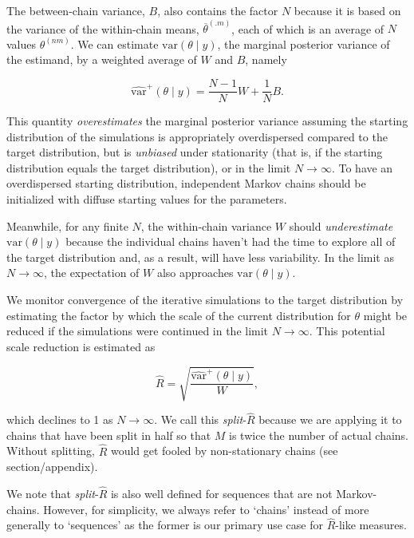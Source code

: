 \documentclass[american,]{article}
\begin{document}
The between-chain variance, \(B\), also contains the factor \(N\)
because it is based on the variance of the within-chain means,
\(\overline{\theta}^{(.m)}\), each of which is an average of \(N\)
values \(\theta^{(nm)}\). We can estimate \(\mbox{var}(\theta \mid y)\),
the marginal posterior variance of the estimand, by a weighted average
of \(W\) and \(B\), namely

\begin{equation}
\widehat{\mbox{var}}^+(\theta \mid y) = \frac{N-1}{N}W + \frac{1}{N}B.
\end{equation}

This quantity \emph{overestimates} the marginal posterior variance
assuming the starting distribution of the simulations is appropriately
overdispersed compared to the target distribution, but is
\emph{unbiased} under stationarity (that is, if the starting
distribution equals the target distribution), or in the limit
\(N\rightarrow\infty\). To have an overdispersed starting distribution,
independent Markov chains should be initialized with diffuse starting
values for the parameters.

Meanwhile, for any finite \(N\), the within-chain variance \(W\) should
\emph{underestimate} \(\mbox{var}(\theta \mid y)\) because the
individual chains haven't had the time to explore all of the target
distribution and, as a result, will have less variability. In the limit
as \(N\rightarrow\infty\), the expectation of \(W\) also approaches
\(\mbox{var}(\theta \mid y)\).

We monitor convergence of the iterative simulations to the target
distribution by estimating the factor by which the scale of the current
distribution for \(\theta\) might be reduced if the simulations were
continued in the limit \(N\rightarrow\infty\). This potential scale
reduction is estimated as

\begin{equation}
\widehat{R} = \sqrt{\frac{\widehat{\mbox{var}}^+(\theta \mid y)}{W}},
\end{equation}

which declines to 1 as \(N\rightarrow\infty\). We call this
\emph{split}-\(\widehat{R}\) because we are applying it to chains that
have been split in half so that \(M\) is twice the number of actual
chains. Without splitting, \(\widehat{R}\) would get fooled by
non-stationary chains (see section/appendix).

We note that \emph{split}-\(\widehat{R}\) is also well defined for
sequences that are not Markov-chains. However, for simplicity, we always
refer to `chains' instead of more generally to `sequences' as the former
is our primary use case for \(\widehat{R}\)-like measures.
\end{document}
